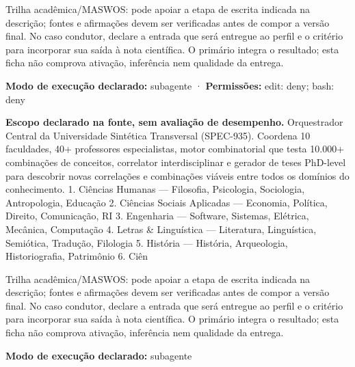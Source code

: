 \begin{funcao}
Trilha acadêmica/MASWOS: pode apoiar a etapa de escrita indicada na descrição; fontes e afirmações devem ser verificadas antes de compor a versão final. No caso condutor, declare a entrada que será entregue ao perfil e o critério para incorporar sua saída à nota científica. O primário integra o resultado; esta ficha não comprova ativação, inferência nem qualidade da entrega.
\end{funcao}

\begin{arquitetura}
\textbf{Modo de execução declarado:} subagente · \textbf{Permissões:} edit: deny; bash: deny
\end{arquitetura}


\begin{descricao}
\textbf{Escopo declarado na fonte, sem avaliação de desempenho.}
Orquestrador Central da Universidade Sintética Transversal (SPEC-935). Coordena 10 faculdades, 40+ professores especialistas, motor combinatorial que testa 10.000+ combinações de conceitos, correlator interdisciplinar e gerador de teses PhD-level para descobrir novas correlações e combinações viáveis entre todos os domínios do conhecimento. 1. Ciências Humanas — Filosofia, Psicologia, Sociologia, Antropologia, Educação 2. Ciências Sociais Aplicadas — Economia, Política, Direito, Comunicação, RI 3. Engenharia — Software, Sistemas, Elétrica, Mecânica, Computação 4. Letras \& Linguística — Literatura, Linguística, Semiótica, Tradução, Filologia 5. História — História, Arqueologia, Historiografia, Patrimônio 6. Ciên
\end{descricao}

\begin{funcao}
Trilha acadêmica/MASWOS: pode apoiar a etapa de escrita indicada na descrição; fontes e afirmações devem ser verificadas antes de compor a versão final. No caso condutor, declare a entrada que será entregue ao perfil e o critério para incorporar sua saída à nota científica. O primário integra o resultado; esta ficha não comprova ativação, inferência nem qualidade da entrega.
\end{funcao}

\begin{arquitetura}
\textbf{Modo de execução declarado:} subagente
\end{arquitetura}


